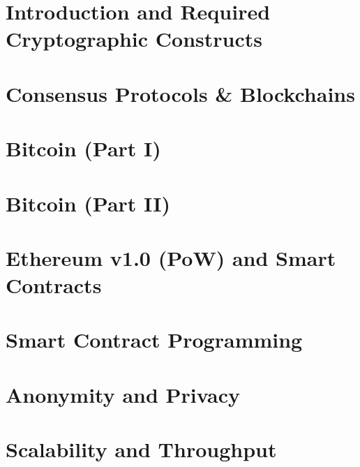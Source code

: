\documentclass[a4paper,12pt,openany]{article}
\begin{document}
\section{Introduction and Required Cryptographic Constructs}\label{sec:intro}

\newpage

\section{Consensus Protocols \& Blockchains}\label{sec:consensus-protocols-blockchains}

\newpage

\section{Bitcoin (Part I)}\label{chapter-3-bitcoin-part-1}

\newpage

\section{Bitcoin (Part II)}\label{chapter-3-bitcoin-part-2}

\newpage

\section{Ethereum v1.0 (PoW) and Smart Contracts}\label{chapter-4-Eth1}

\newpage

\section{Smart Contract Programming}\label{chapter-6-smart-contract-programming}


\section{Anonymity and Privacy}\label{chapter-6-anonoymity}


\section{Scalability and Throughput}\label{chapter-6-scalability}


\end{document}
